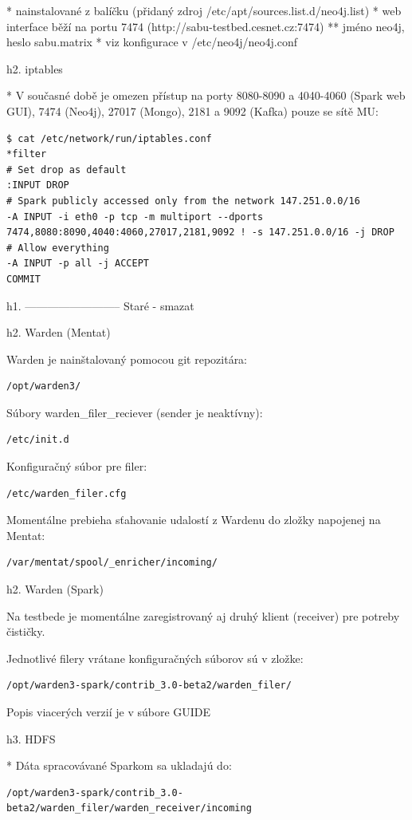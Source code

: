 \documentclass[a4paper]{article} %
\begin{document}
* nainstalované z balíčku (přidaný zdroj /etc/apt/sources.list.d/neo4j.list)
* web interface běží na portu 7474 (http://sabu-testbed.cesnet.cz:7474)
** jméno neo4j, heslo sabu.matrix
* viz konfigurace v /etc/neo4j/neo4j.conf

h2. iptables

* V současné době je omezen přístup na porty 8080-8090 a 4040-4060 (Spark web GUI), 7474 (Neo4j), 27017 (Mongo), 2181 a 9092 (Kafka) pouze se sítě MU:
\begin{lstlisting}[]
$ cat /etc/network/run/iptables.conf
*filter
# Set drop as default
:INPUT DROP
# Spark publicly accessed only from the network 147.251.0.0/16
-A INPUT -i eth0 -p tcp -m multiport --dports 7474,8080:8090,4040:4060,27017,2181,9092 ! -s 147.251.0.0/16 -j DROP
# Allow everything
-A INPUT -p all -j ACCEPT
COMMIT
\end{lstlisting}

h1. --------------------------
Staré - smazat

h2. Warden (Mentat)

Warden je nainštalovaný pomocou git repozitára:
\begin{lstlisting}[]/opt/warden3/\end{lstlisting}
Súbory warden_filer_reciever (sender je neaktívny):
\begin{lstlisting}[]/etc/init.d\end{lstlisting}
Konfiguračný súbor pre filer:
\begin{lstlisting}[]/etc/warden_filer.cfg\end{lstlisting}
Momentálne prebieha sťahovanie udalostí z Wardenu do zložky napojenej na Mentat:
\begin{lstlisting}[]/var/mentat/spool/_enricher/incoming/\end{lstlisting}

h2. Warden (Spark)

Na testbede je momentálne zaregistrovaný aj druhý klient (receiver) pre potreby čističky.

Jednotlivé filery vrátane konfiguračných súborov sú v zložke:
\begin{lstlisting}[]/opt/warden3-spark/contrib_3.0-beta2/warden_filer/\end{lstlisting}

Popis viacerých verzií je v súbore GUIDE

h3. HDFS

* Dáta spracovávané Sparkom sa ukladajú do:
\begin{lstlisting}[]/opt/warden3-spark/contrib_3.0-beta2/warden_filer/warden_receiver/incoming\end{lstlisting}
\end{document}
